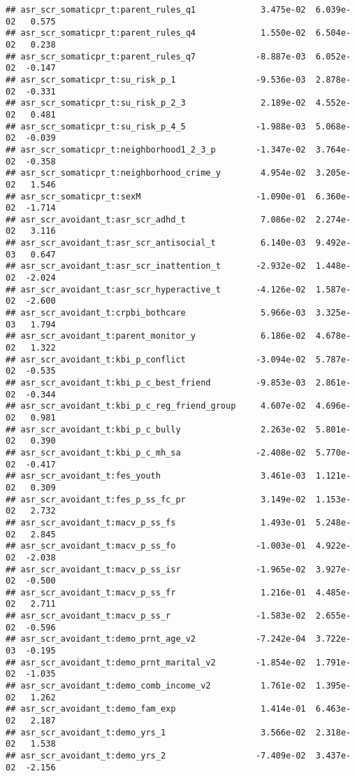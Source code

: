 \documentclass[
]{article}
\begin{document}
\begin{verbatim}
## asr_scr_somaticpr_t:parent_rules_q1             3.475e-02  6.039e-02   0.575
## asr_scr_somaticpr_t:parent_rules_q4             1.550e-02  6.504e-02   0.238
## asr_scr_somaticpr_t:parent_rules_q7            -8.887e-03  6.052e-02  -0.147
## asr_scr_somaticpr_t:su_risk_p_1                -9.536e-03  2.878e-02  -0.331
## asr_scr_somaticpr_t:su_risk_p_2_3               2.189e-02  4.552e-02   0.481
## asr_scr_somaticpr_t:su_risk_p_4_5              -1.988e-03  5.068e-02  -0.039
## asr_scr_somaticpr_t:neighborhood1_2_3_p        -1.347e-02  3.764e-02  -0.358
## asr_scr_somaticpr_t:neighborhood_crime_y        4.954e-02  3.205e-02   1.546
## asr_scr_somaticpr_t:sexM                       -1.090e-01  6.360e-02  -1.714
## asr_scr_avoidant_t:asr_scr_adhd_t               7.086e-02  2.274e-02   3.116
## asr_scr_avoidant_t:asr_scr_antisocial_t         6.140e-03  9.492e-03   0.647
## asr_scr_avoidant_t:asr_scr_inattention_t       -2.932e-02  1.448e-02  -2.024
## asr_scr_avoidant_t:asr_scr_hyperactive_t       -4.126e-02  1.587e-02  -2.600
## asr_scr_avoidant_t:crpbi_bothcare               5.966e-03  3.325e-03   1.794
## asr_scr_avoidant_t:parent_monitor_y             6.186e-02  4.678e-02   1.322
## asr_scr_avoidant_t:kbi_p_conflict              -3.094e-02  5.787e-02  -0.535
## asr_scr_avoidant_t:kbi_p_c_best_friend         -9.853e-03  2.861e-02  -0.344
## asr_scr_avoidant_t:kbi_p_c_reg_friend_group     4.607e-02  4.696e-02   0.981
## asr_scr_avoidant_t:kbi_p_c_bully                2.263e-02  5.801e-02   0.390
## asr_scr_avoidant_t:kbi_p_c_mh_sa               -2.408e-02  5.770e-02  -0.417
## asr_scr_avoidant_t:fes_youth                    3.461e-03  1.121e-02   0.309
## asr_scr_avoidant_t:fes_p_ss_fc_pr               3.149e-02  1.153e-02   2.732
## asr_scr_avoidant_t:macv_p_ss_fs                 1.493e-01  5.248e-02   2.845
## asr_scr_avoidant_t:macv_p_ss_fo                -1.003e-01  4.922e-02  -2.038
## asr_scr_avoidant_t:macv_p_ss_isr               -1.965e-02  3.927e-02  -0.500
## asr_scr_avoidant_t:macv_p_ss_fr                 1.216e-01  4.485e-02   2.711
## asr_scr_avoidant_t:macv_p_ss_r                 -1.583e-02  2.655e-02  -0.596
## asr_scr_avoidant_t:demo_prnt_age_v2            -7.242e-04  3.722e-03  -0.195
## asr_scr_avoidant_t:demo_prnt_marital_v2        -1.854e-02  1.791e-02  -1.035
## asr_scr_avoidant_t:demo_comb_income_v2          1.761e-02  1.395e-02   1.262
## asr_scr_avoidant_t:demo_fam_exp                 1.414e-01  6.463e-02   2.187
## asr_scr_avoidant_t:demo_yrs_1                   3.566e-02  2.318e-02   1.538
## asr_scr_avoidant_t:demo_yrs_2                  -7.409e-02  3.437e-02  -2.156

\end{verbatim}
\end{document}
